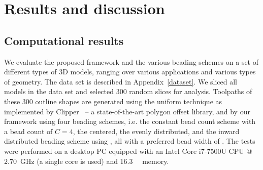 \section{Results and discussion}





\revise{}
{
\subsection{Computational results}\label{sec_computational_results}
} %
We evaluate the proposed framework and the various beading schemes on a set of different types of 3D models, ranging over various applications and various types of geometry. 
The data set is described in Appendix~\ref{dataset}.
We sliced all models in the data set and selected 300 random slices for analysis.
Toolpaths of these 300 outline shapes are generated using the uniform technique as implemented by Clipper~\cite{johnson2014clipper} -- a state-of-the-art polygon offset library,
and by our framework using four beading schemes, i.e. the constant bead count scheme with a bead count of $C=4$, the centered, the evenly distributed, and the inward distributed beading scheme using , all with a preferred bead width of .
The tests were performed on a desktop PC equipped with an Intel Core i7-7500U CPU @ \SI{2.70}{\giga\hertz} (a single core is used) and \SI{16.3}{\giga\byte} memory.






